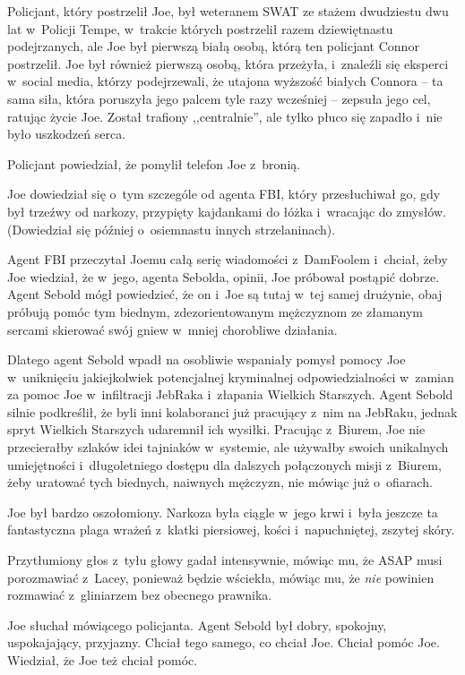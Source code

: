 \documentclass[oneside,polish,11pt,sfheadings]{mwbk}
\begin{document}
Policjant, który postrzelił Joe, był weteranem SWAT ze stażem dwudziestu
dwu lat w~Policji Tempe, w~trakcie których postrzelił razem
dziewiętnastu podejrzanych, ale Joe był pierwszą białą osobą, którą ten
policjant Connor postrzelił. Joe był również pierwszą osobą, która
przeżyła, i~znaleźli się eksperci w~social media, którzy podejrzewali,
że utajona wyższość białych Connora -- ta sama siła, która poruszyła jego
palcem tyle razy wcześniej -- zepsuła jego cel, ratując życie Joe. Został
trafiony ,,centralnie'', ale tylko płuco się zapadło i~nie było
uszkodzeń serca.

Policjant powiedział, że pomylił telefon Joe z~bronią.

Joe dowiedział się o~tym szczególe od agenta FBI, który przesłuchiwał
go, gdy był trzeźwy od narkozy, przypięty kajdankami do łóżka i~wracając
do zmysłów. (Dowiedział się później o~osiemnastu innych strzelaninach).

Agent FBI przeczytał Joemu całą serię wiadomości z~DamFoolem i~chciał,
żeby Joe wiedział, że w~jego, agenta Sebolda, opinii, Joe próbował
postąpić dobrze. Agent Sebold mógł powiedzieć, że on i~Joe są tutaj w~tej samej drużynie, obaj próbują pomóc tym biednym, zdezorientowanym
mężczyznom ze złamanym sercami skierować swój gniew w~mniej chorobliwe
działania.

Dlatego agent Sebold wpadł na osobliwie wspaniały pomysł pomocy Joe w~uniknięciu jakiejkolwiek potencjalnej kryminalnej odpowiedzialności w~zamian za pomoc Joe w~infiltracji JebRaka i~złapania Wielkich Starszych.
Agent Sebold silnie podkreślił, że byli inni kolaboranci już pracujący z~nim na JebRaku, jednak spryt Wielkich Starszych udaremnił ich wysiłki.
Pracując z~Biurem, Joe nie przecierałby szlaków idei tajniaków w~systemie, ale używałby swoich unikalnych umiejętności i~długoletniego
dostępu dla dalszych połączonych misji z~Biurem, żeby uratować tych
biednych, naiwnych mężczyzn, nie mówiąc już o~ofiarach.

Joe był bardzo oszołomiony. Narkoza była ciągle w~jego krwi i~była
jeszcze ta fantastyczna plaga wrażeń z~klatki piersiowej, kości i~napuchniętej, zszytej skóry.

Przytłumiony głos z~tyłu głowy gadał intensywnie, mówiąc mu, że ASAP
musi porozmawiać z~Lacey, ponieważ będzie wściekła, mówiąc mu, że
\textit{nie} powinien rozmawiać z~gliniarzem bez obecnego prawnika.

Joe słuchał mówiącego policjanta. Agent Sebold był dobry, spokojny,
uspokajający, przyjazny. Chciał tego samego, co chciał Joe. Chciał pomóc
Joe. Wiedział, że Joe też chciał pomóc.
\end{document}
